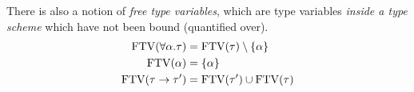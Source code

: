 There is also a notion of \emph{free type variables}, which are type
variables \emph{inside a type scheme} which have not been bound
(quantified over).
\begin{align*}
  \operatorname{FTV}(\forall \alpha . \tau) &= \operatorname{FTV}(\tau) \setminus \{\alpha\} \\
  \operatorname{FTV}(\alpha) &= \{ \alpha \} \\
  \operatorname{FTV}(\tau \rightarrow \tau') &= \operatorname{FTV}(\tau') \cup \operatorname{FTV}(\tau)
\end{align*}








